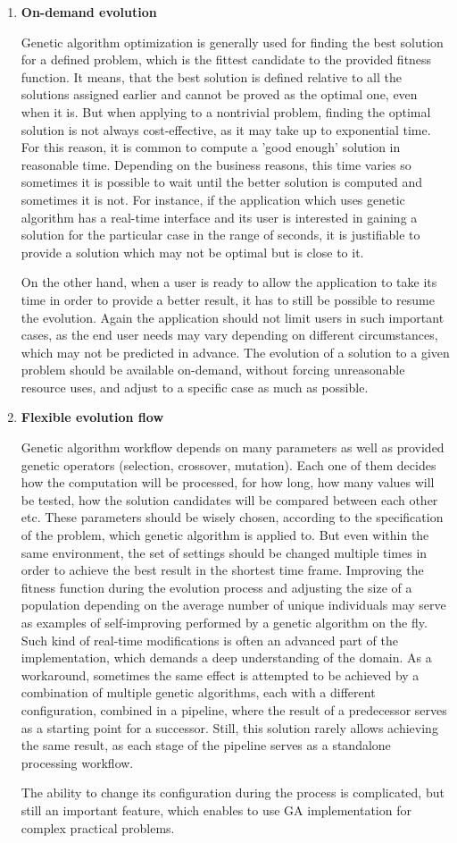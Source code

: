 \begin{enumerate}
\item 
\textbf{On-demand evolution}

Genetic algorithm optimization is generally used for finding the best solution for a defined problem, which is the fittest candidate to the provided fitness function. It means, that the best solution is defined relative to all the solutions assigned earlier and cannot be proved as the optimal one, even when it is. But when applying to a nontrivial problem, finding the optimal solution is not always cost-effective, as it may take up to exponential time. For this reason, it is common to compute a 'good enough' solution in reasonable time. Depending on the business reasons, this time varies so sometimes it is possible to wait until the better solution is computed and sometimes it is not. For instance, if the application which uses genetic algorithm has a real-time interface and its user is interested in gaining a solution for the particular case in the range of seconds, it is justifiable to provide a solution which may not be optimal but is close to it.

On the other hand, when a user is ready to allow the application to take its time in order to provide a better result, it has to still be possible to resume the evolution. Again the application should not limit users in such important cases, as the end user needs may vary depending on different circumstances, which may not be predicted in advance. The evolution of a solution to a given problem should be available on-demand, without forcing unreasonable resource uses, and adjust to a specific case as much as possible.
\\

\item
\textbf{Flexible evolution flow}

Genetic algorithm workflow depends on many parameters as well as provided genetic operators (selection, crossover, mutation). Each one of them decides how the computation will be processed, for how long, how many values will be tested, how the solution candidates will be compared between each other etc. These parameters should be wisely chosen, according to the specification of the problem, which genetic algorithm is applied to. But even within the same environment, the set of settings should be changed multiple times in order to achieve the best result in the shortest time frame. Improving the fitness function during the evolution process and adjusting the size of a population depending on the average number of unique individuals may serve as examples of self-improving performed by a genetic algorithm on the fly. Such kind of real-time modifications is often an advanced part of the implementation, which demands a deep understanding of the domain. As a workaround, sometimes the same effect is attempted to be achieved by a combination of multiple genetic algorithms, each with a different configuration, combined in a pipeline, where the result of a predecessor serves as a starting point for a successor. Still, this solution rarely allows achieving the same result, as each stage of the pipeline serves as a standalone processing workflow.

The ability to change its configuration during the process is complicated, but still an important feature, which enables to use GA implementation for complex practical problems.

\end{enumerate}